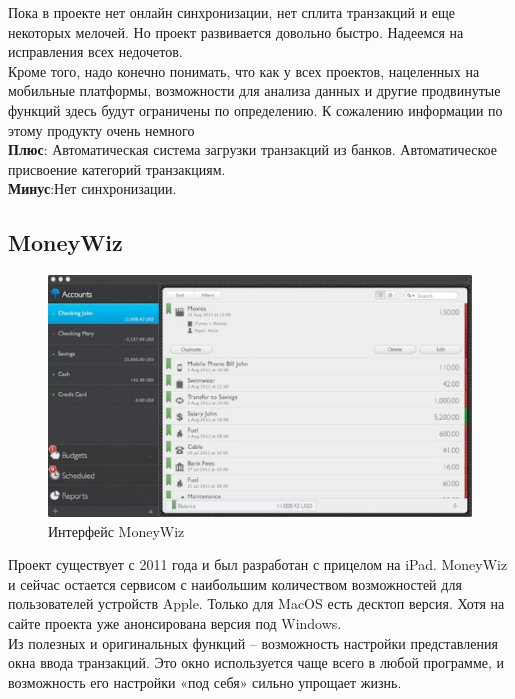 Пока в проекте нет онлайн синхронизации, нет сплита транзакций и еще некоторых мелочей. Но проект развивается довольно быстро. Надеемся на исправления всех недочетов.\\

Кроме того, надо конечно понимать, что как у всех проектов, нацеленных на мобильные платформы, возможности для анализа данных и другие продвинутые функций здесь будут ограничены по определению. К сожалению информации по этому продукту очень немного\\
\textbf{Плюс}: Автоматическая система загрузки транзакций из банков. Автоматическое присвоение категорий транзакциям.
\\
\textbf{Минус}:Нет синхронизации.\\
\pagebreak

\subsection{MoneyWiz}
\begin{figure}[H]
	\centering
	\includegraphics[width=1\linewidth]{pics/MoneyWiz.eps}
	\caption{Интерфейс MoneyWiz}
	\label{fig:MoneyWiz}
\end{figure}
Проект существует с 2011 года и был разработан с прицелом на iPad. MoneyWiz и сейчас остается сервисом с наибольшим количеством возможностей для пользователей устройств Apple. Только для MacOS есть десктоп версия. Хотя на сайте проекта уже анонсирована версия под Windows.\\

Из полезных и оригинальных функций – возможность настройки представления окна ввода транзакций. Это окно используется чаще всего в любой программе, и возможность его настройки «под себя» сильно упрощает жизнь.\\


